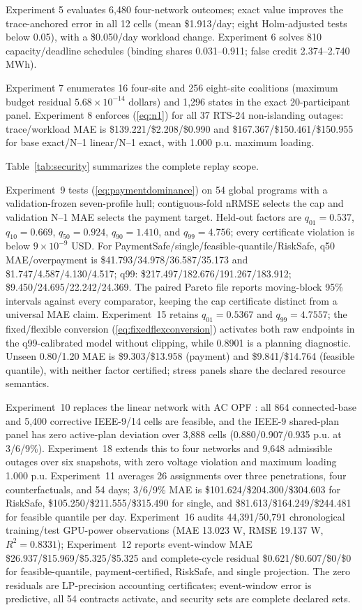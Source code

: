 \documentclass[10pt,journal]{IEEEtran}
\begin{document}
Experiment 5 evaluates 6,480 four-network outcomes; exact value improves the
trace-anchored error in all 12 cells (mean \$1.913/day; eight Holm-adjusted
tests below 0.05), with a \$0.050/day workload change. Experiment 6 solves 810
capacity/deadline schedules (binding shares 0.031--0.911; false credit
2.374--2.740 MWh).

Experiment 7 enumerates 16 four-site and 256 eight-site coalitions (maximum
budget residual $5.68\times10^{-14}$ dollars) and 1,296 states in the exact
20-participant panel. Experiment 8 enforces (\ref{eq:n1}) for all 37 RTS-24
non-islanding outages: trace/workload MAE is
\$139.221/\$2.208/\$0.990 and \$167.367/\$150.461/\$150.955 for
base exact/N--1 linear/N--1 exact, with 1.000 p.u. maximum loading.

Table~\ref{tab:security} summarizes the complete replay scope.

Experiment~9 tests (\ref{eq:paymentdominance}) on 54 global programs with a
validation-frozen seven-profile hull; contiguous-fold nRMSE selects the cap and
validation N--1 MAE selects the payment target. Held-out factors are
$q_{01}=0.537$, $q_{10}=0.669$, $q_{50}=0.924$, $q_{90}=1.410$, and
$q_{99}=4.756$; every certificate violation is below $9\times10^{-9}$ USD.
For PaymentSafe/single/feasible-quantile/RiskSafe, q50 MAE/overpayment is
\$41.793/34.978/36.587/35.173 and \$1.747/4.587/4.130/4.517; q99:
{\scriptsize \$217.497/182.676/191.267/183.912; \$9.450/24.695/22.242/24.369}. The
paired Pareto file reports moving-block 95\% intervals against every
comparator, keeping the cap certificate distinct from a universal MAE claim.
Experiment~15 retains $q_{01}=0.5367$ and $q_{99}=4.7557$; the fixed/flexible
conversion (\ref{eq:fixedflexconversion}) activates both raw endpoints in the
q99-calibrated model without clipping, while 0.8901 is a planning diagnostic.
Unseen 0.80/1.20 MAE is \$9.303/\$13.958 (payment) and \$9.841/\$14.764
(feasible quantile), with neither factor certified; stress panels share the
declared resource semantics.

Experiment~10 replaces the linear network with AC OPF
\cite{zimmerman2011matpower}: all 864 connected-base and 5,400 corrective
IEEE-9/14 cells are feasible, and the IEEE-9 shared-plan panel has zero
active-plan deviation over 3,888 cells (0.880/0.907/0.935 p.u. at 3/6/9\%).
Experiment~18 extends this to four networks and 9,648 admissible outages over
six snapshots, with zero voltage violation and maximum loading 1.000 p.u.
Experiment~11 averages 26 assignments over three penetrations, four
counterfactuals, and 54 days; 3/6/9\% MAE is
\$101.624/\$204.300/\$304.603 for RiskSafe, \$105.250/\$211.555/\$315.490 for
single, and \$81.613/\$164.249/\$244.481 for feasible quantile per day.
Experiment~16 audits 44,391/50,791 chronological training/test GPU-power
observations (MAE 13.023 W, RMSE 19.137 W, $R^2=0.8331$); Experiment~12 reports
event-window MAE \$26.937/\$15.969/\$5.325/\$5.325 and complete-cycle residual
\$0.621/\$0.607/\$0/\$0 for feasible-quantile, payment-certified, RiskSafe, and
single projection. The zero residuals are LP-precision accounting certificates;
event-window error is predictive, all 54 contracts activate, and security sets
are complete declared sets.
\end{document}
